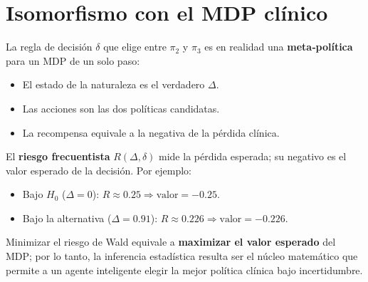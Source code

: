 \documentclass[12pt,a4paper]{article}
\begin{document}
	\section{Isomorfismo con el MDP clínico}
	
	La regla de decisión \(\delta\) que elige entre \(\pi_2\) y \(\pi_3\) es en realidad una \textbf{meta‑política} para un MDP de un solo paso:
	\begin{itemize}
		\item El estado de la naturaleza es el verdadero \(\Delta\).
		\item Las acciones son las dos políticas candidatas.
		\item La recompensa equivale a la negativa de la pérdida clínica.
	\end{itemize}
	El \textbf{riesgo frecuentista} \(R(\Delta, \delta)\) mide la pérdida esperada; su negativo es el valor esperado de la decisión. Por ejemplo:
	\begin{itemize}
		\item Bajo \(H_0\) (\(\Delta = 0\)): \(R \approx 0.25 \Rightarrow \text{valor} = -0.25\).
		\item Bajo la alternativa (\(\Delta = 0.91\)): \(R \approx 0.226 \Rightarrow \text{valor} = -0.226\).
	\end{itemize}
	Minimizar el riesgo de Wald equivale a \textbf{maximizar el valor esperado} del MDP; por lo tanto, la inferencia estadística resulta ser el núcleo matemático que permite a un agente inteligente elegir la mejor política clínica bajo incertidumbre.
	
\end{document}
